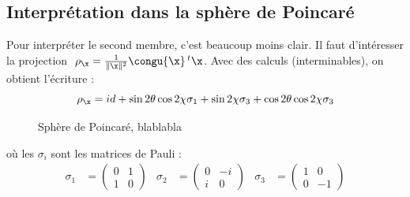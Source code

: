 \subsection{Interprétation dans la sphère de Poincaré}

Pour interpréter le second membre, c'est beaucoup moins clair. Il faut d'intéresser  la projection  $\ \rho_{\x} = \frac{1}{\|\x \|^2} \congu{\x }\, ^t\x $. Avec des calculs (interminables), on obtient l'écriture :
\[\rho_{\x} = id + \sin2\theta\cos2\chi \sigma_1 + \sin 2\chi \sigma_3 + \cos2\theta \cos2\chi \sigma_3\]


\begin{figure}
	
	\caption{Sphère de Poincaré, blablabla}
	\label{fig:sphere2pointcare}
\end{figure}

\par
où les $\sigma_i$ sont les matrices de Pauli :
\begin{align*}
	\sigma_1 &= \begin{pmatrix} 0 & 1 \\ 1 &  0 \end{pmatrix}  &
	\sigma_2 &= \begin{pmatrix} 0 & -i \\  i &  0 \end{pmatrix}  &
	\sigma_3 &= \begin{pmatrix} 1 & 0 \\ 0 & -1 \end{pmatrix}
\end{align*}
\par

